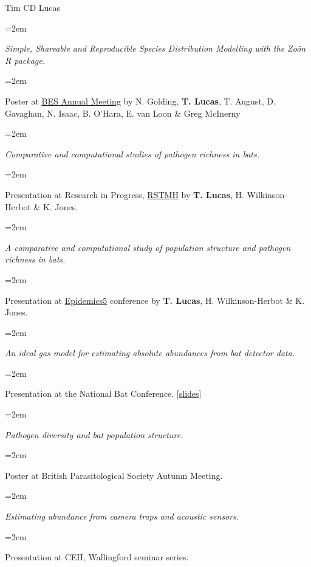 \documentclass{scrartcl}
\newcommand{\Description}[1]{\hangindent=2em\hangafter=0\noindent\raggedright\footnotesize{#1}\par\normalsize\vspace{1em}} %
\newcommand{\MoreDescription}[1]{\hangindent=2em\hangafter=0\noindent\raggedright\scriptsize{#1}\par\normalsize\vspace{1em}} %
\begin{document}
\begin{cv}{Tim {\Large CD} Lucas}
\vspace{-0.5em}


\Description{\emph{Simple, Shareable and Reproducible Species Distribution Modelling with the Zo\"{o}n R package.}}\vspace{-1em}
\MoreDescription{Poster at \href{http://www.britishecologicalsociety.org/events/current_future_meetings/past-bes-annual-meetings/2015-annual-meeting/}{BES Annual Meeting} by N. Golding, \textbf{T. Lucas}, T. August, D. Gavaghan, N. Isaac, B. O'Hara, E. van Loon \& Greg McInerny  }

\vspace{-0.5em}

\Description{\emph{Comparative and computational studies of pathogen richness in bats.}}\vspace{-1em}
\MoreDescription{Presentation at Research in Progress, \href{https://rstmh.org/events/research-progress-2015}{RSTMH} by \textbf{T. Lucas}, H. Wilkinson-Herbot \& K. Jones.}

\vspace{-0.5em}

\Description{\emph{A comparative and computational study of population structure and pathogen richness in bats.}}\vspace{-1em}
\MoreDescription{Presentation at \href{http://www.epidemics.elsevier.com/}{Epidemics5} conference by \textbf{T. Lucas}, H. Wilkinson-Herbot \& K. Jones.}

\vspace{-0.5em}



\Description{\emph{An ideal gas model for estimating absolute abundances from bat detector data.}}\vspace{-1em}
\MoreDescription{Presentation at the National Bat Conference. [\href{http://www.slideshare.net/timcdlucas/tim-lucasnbc}{slides}]}

\vspace{-0.5em}

\Description{\emph{Pathogen diversity and bat population structure.}}\vspace{-1em}
\MoreDescription{Poster at British Parasitological Society Autumn Meeting.}


\vspace{-0.5em}

\Description{\emph{Estimating abundance from camera traps and acoustic sensors.}}\vspace{-1em}
\MoreDescription{Presentation at {\footnotesize CEH}, Wallingford seminar series.}



\end{cv}
\end{document}
